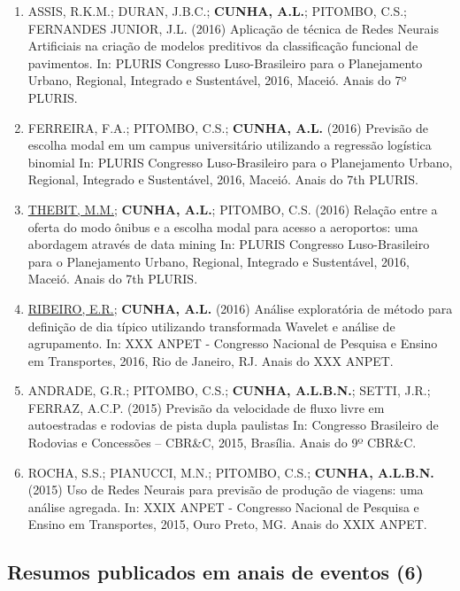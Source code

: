\documentclass[
  brazilian,
  11pt,
  a4paper,
]{article}
\begin{document}
\begin{enumerate}
  Pesquisa e Ensino em Transportes, 2017, Recife. Anais do XXXI ANPET.
\item
  ASSIS, R.K.M.; DURAN, J.B.C.; \textbf{CUNHA, A.L.}; PITOMBO, C.S.;
  FERNANDES JUNIOR, J.L. (2016) Aplicação de técnica de Redes Neurais
  Artificiais na criação de modelos preditivos da classificação
  funcional de pavimentos. In: PLURIS Congresso Luso-Brasileiro para o
  Planejamento Urbano, Regional, Integrado e Sustentável, 2016, Maceió.
  Anais do 7º PLURIS.
\item
  FERREIRA, F.A.; PITOMBO, C.S.; \textbf{CUNHA, A.L.} (2016) Previsão de
  escolha modal em um campus universitário utilizando a regressão
  logística binomial In: PLURIS Congresso Luso-Brasileiro para o
  Planejamento Urbano, Regional, Integrado e Sustentável, 2016, Maceió.
  Anais do 7th PLURIS.
\item
  \ul{THEBIT, M.M.}; \textbf{CUNHA, A.L.}; PITOMBO, C.S. (2016) Relação
  entre a oferta do modo ônibus e a escolha modal para acesso a
  aeroportos: uma abordagem através de data mining In: PLURIS Congresso
  Luso-Brasileiro para o Planejamento Urbano, Regional, Integrado e
  Sustentável, 2016, Maceió. Anais do 7th PLURIS.
\item
  \ul{RIBEIRO, E.R.}; \textbf{CUNHA, A.L.} (2016) Análise exploratória
  de método para definição de dia típico utilizando transformada Wavelet
  e análise de agrupamento. In: XXX ANPET - Congresso Nacional de
  Pesquisa e Ensino em Transportes, 2016, Rio de Janeiro, RJ. Anais do
  XXX ANPET.
\item
  ANDRADE, G.R.; PITOMBO, C.S.; \textbf{CUNHA, A.L.B.N.}; SETTI, J.R.;
  FERRAZ, A.C.P. (2015) Previsão da velocidade de fluxo livre em
  autoestradas e rodovias de pista dupla paulistas In: Congresso
  Brasileiro de Rodovias e Concessões -- CBR\&C, 2015, Brasília. Anais
  do 9º CBR\&C.
\item
  ROCHA, S.S.; PIANUCCI, M.N.; PITOMBO, C.S.; \textbf{CUNHA, A.L.B.N.}
  (2015) Uso de Redes Neurais para previsão de produção de viagens: uma
  análise agregada. In: XXIX ANPET - Congresso Nacional de Pesquisa e
  Ensino em Transportes, 2015, Ouro Preto, MG. Anais do XXIX ANPET.
\end{enumerate}

\subsection{Resumos publicados em anais de eventos
(6)}\label{resumos-publicados-em-anais-de-eventos-6}
\end{document}
